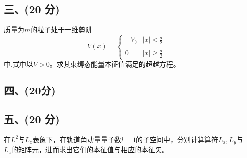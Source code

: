 \subsection{三、(20 分) }
质量为$m$的粒子处于一维勢阱
$$V(x) = 
\begin{cases} 
-V_0 & |x| < \frac{a}{2} \\\\
0 &  |x| \geq \frac{a}{2} 
\end{cases}~
$$
中,式中以$V>0$。求其束缚态能量本征值满足的超越方程。
\subsection{四、(20分) }

\subsection{五、(20 分)}
在$L^2$与$L_z$表象下，在轨道角动量量子数$l=1$的子空间中，分别计算算符$L_x,L_y$与$L_z$的矩阵元，进而求出它们的本征值与相应的本征矢。